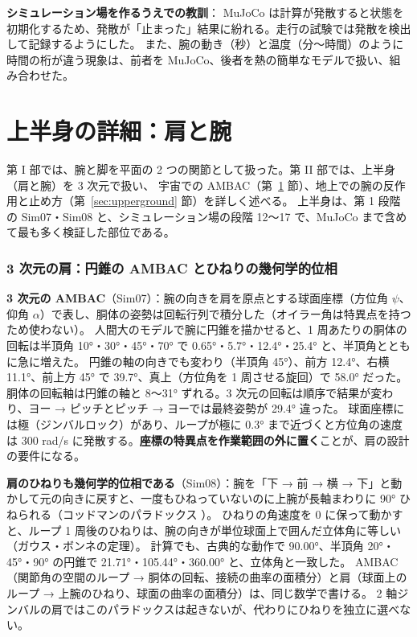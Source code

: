 \documentclass[paper=a4paper,fontsize=10pt,twocolumn,column_gap=2zw,line_length=24zw,number_of_lines=46,head_space=20mm]{jlreq}
\begin{document}
\textbf{シミュレーション場を作るうえでの教訓}：
MuJoCo は計算が発散すると状態を初期化するため、発散が「止まった」結果に紛れる。走行の試験では発散を検出して記録するようにした。
また、腕の動き（秒）と温度（分〜時間）のように時間の桁が違う現象は、前者を MuJoCo、後者を熱の簡単なモデルで扱い、組み合わせた。


\part{上半身の詳細：肩と腕}

第 I 部では、腕と脚を平面の 2 つの関節として扱った。第 II 部では、上半身（肩と腕）を 3 次元で扱い、
宇宙での AMBAC（第~\ref{sec:upper3d} 節）、地上での腕の反作用と止め方（第~\ref{sec:upperground} 節）を詳しく述べる。
上半身は、第 1 段階の Sim07・Sim08 と、シミュレーション場の段階 12〜17 で、MuJoCo まで含めて最も多く検証した部位である。

\section{3 次元の肩：円錐の AMBAC とひねりの幾何学的位相}\label{sec:upper3d}

\textbf{3 次元の AMBAC}（Sim07）：腕の向きを肩を原点とする球面座標（方位角 $\psi$、仰角 $\alpha$）で表し、胴体の姿勢は回転行列で積分した（オイラー角は特異点を持つため使わない）。
人間大のモデルで腕に円錐を描かせると、1 周あたりの胴体の回転は半頂角 10°・30°・45°・70° で 0.65°・5.7°・12.4°・25.4° と、半頂角とともに急に増えた。
円錐の軸の向きでも変わり（半頂角 45°）、前方 12.4°、右横 11.1°、前上方 45° で 39.7°、真上（方位角を 1 周させる旋回）で 58.0° だった。
胴体の回転軸は円錐の軸と 8〜31° ずれる。3 次元の回転は順序で結果が変わり、ヨー → ピッチとピッチ → ヨーでは最終姿勢が 29.4° 違った。
球面座標には極（ジンバルロック）があり、ループが極に 0.3° まで近づくと方位角の速度は 300 rad/s に発散する。\textbf{座標の特異点を作業範囲の外に置く}ことが、肩の設計の要件になる。

\textbf{肩のひねりも幾何学的位相である}（Sim08）：腕を「下 → 前 → 横 → 下」と動かして元の向きに戻すと、一度もひねっていないのに上腕が長軸まわりに 90° ひねられる（コッドマンのパラドックス \cite{codman1934}）。
ひねりの角速度を 0 に保って動かすと、ループ 1 周後のひねりは、腕の向きが単位球面上で囲んだ立体角に等しい（ガウス・ボンネの定理）。
計算でも、古典的な動作で 90.00°、半頂角 20°・45°・90° の円錐で 21.71°・105.44°・360.00° と、立体角と一致した。
AMBAC（関節角の空間のループ → 胴体の回転、接続の曲率の面積分）と肩（球面上のループ → 上腕のひねり、球面の曲率の面積分）は、同じ数学で書ける。
2 軸ジンバルの肩ではこのパラドックスは起きないが、代わりにひねりを独立に選べない。
\end{document}
